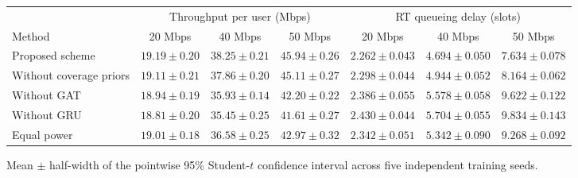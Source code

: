 \begingroup
\footnotesize
\renewcommand{\arraystretch}{1.15}
\setlength{\tabcolsep}{4pt}
\begin{tabular*}{\linewidth}{@{\extracolsep{\fill}}lcccccc@{}}
\hline
& \multicolumn{3}{c}{Throughput per user (Mbps)} & \multicolumn{3}{c}{RT queueing delay (slots)} \\
\cline{2-4}\cline{5-7}
Method & 20 Mbps & 40 Mbps & 50 Mbps & 20 Mbps & 40 Mbps & 50 Mbps \\
\hline
Proposed scheme & $19.19 \pm 0.20$ & $38.25 \pm 0.21$ & $45.94 \pm 0.26$ & $2.262 \pm 0.043$ & $4.694 \pm 0.050$ & $7.634 \pm 0.078$ \\
Without coverage priors & $19.11 \pm 0.21$ & $37.86 \pm 0.20$ & $45.11 \pm 0.27$ & $2.298 \pm 0.044$ & $4.944 \pm 0.052$ & $8.164 \pm 0.062$ \\
Without GAT & $18.94 \pm 0.19$ & $35.93 \pm 0.14$ & $42.20 \pm 0.22$ & $2.386 \pm 0.055$ & $5.578 \pm 0.058$ & $9.622 \pm 0.122$ \\
Without GRU & $18.81 \pm 0.20$ & $35.45 \pm 0.25$ & $41.61 \pm 0.27$ & $2.430 \pm 0.044$ & $5.704 \pm 0.055$ & $9.834 \pm 0.143$ \\
Equal power & $19.01 \pm 0.18$ & $36.58 \pm 0.25$ & $42.97 \pm 0.32$ & $2.342 \pm 0.051$ & $5.342 \pm 0.090$ & $9.268 \pm 0.092$ \\
\hline
\end{tabular*}
\par\smallskip
\noindent\parbox{\linewidth}{\raggedright Mean $\pm$ half-width of the pointwise 95\% Student-$t$ confidence interval across five independent training seeds.}\par
\endgroup
